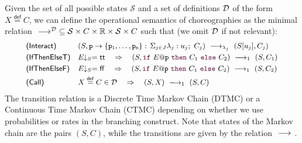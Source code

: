Given the set of all possible states $\mathcal S$ and a set of
definitions $\mathcal D$ of the form $X\stackrel{\mathsf{def}}{=} C$, we
can define the operational semantics of choreographies as the minimal
relation
$\ \longrightarrow_{}\ \!\!\!\!^\mathcal D\subseteq \mathcal S\times C\times \mathbb
R\times \mathcal S\times C$ such that (we omit $\mathcal D$ if not
relevant):
\begin{displaymath}\small
  \begin{array}{l@{\quad}llll}
    \textsf{(Interact)} &
    (S, \interact{p}{\role p_1,\ldots,\role p_n}) 
    \red{\lambda_j}
    (S[u_j], C_j) 
    \\[1mm]
    \textsf{(IfThenElseT)} &
    \eval ES = \mathsf{tt} \quad\Rightarrow\quad
    (S,\ifTE {E}{p}{C_1}{C_2}) 
    \red{1}
    (S, C_1)
    \\[1mm]
    \textsf{(IfThenElseF)} &
    \eval ES = \mathsf{ff} \quad\Rightarrow\quad
    (S,\ifTE {E}{p}{C_1}{C_2}) 
    \red{1}
    (S, C_2)
    \\[1mm]
    \textsf{(Call)} &
    X\stackrel{\mathsf{def}}{=} C\in\defin \quad\Rightarrow\quad (S, X) \red{1}(S,C)
  \end{array}
\end{displaymath}
The transition relation is a Discrete Time Markov Chain (DTMC) or a
Continuous Time Markov Chain (CTMC) depending on whether we use
probabilities or rates in the branching construct. Note that states of
the Markov chain are the pairs $(S,C)$, while the transitions are
given by the relation $\ \longrightarrow_{}\ $.
%

